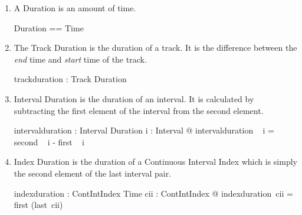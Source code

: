\documentclass[11pt]{article}
\begin{document}
\begin{enumerate}
\begin{zed}
	ContIntIndex == \\
	\t1 \{ ii : IntervalIndex;  i_j, i_{j+1}: Interval  |   \\
 	\t3 \langle i_j, i_{j+1} \rangle \inseq ii \implies  second ~ i_j \geq first ~ i_{j+1}@ ii \}
 \end{zed}




\item A \textsf{Duration} is an amount of time. 

\begin{zed}
	Duration == Time
\end{zed}

\item The \textsf{Track Duration} is the duration of a track. It is the difference between the \emph{end} time and \emph{start} time of the track. 

\begin{axdef}
	trackduration : Track \fun Duration 
\end{axdef}

\item \textsf{Interval Duration} is the duration of an interval. It is calculated by subtracting the first element of the interval from the second element. 

\begin{axdef}
	intervalduration : Interval \fun Duration 
\where
	\forall i : Interval @ intervalduration ~ i = second ~ i - first ~ i 
\end{axdef}


\item \textsf{Index Duration} is the duration of a Continuous Interval Index which is simply the second element of the last interval pair. 

\begin{axdef}
	indexduration : ContIntIndex \fun Time 
\where
\forall cii : ContIntIndex @ indexduration~cii = first (last~cii)
\end{axdef} 


\end{enumerate}
\end{document}
